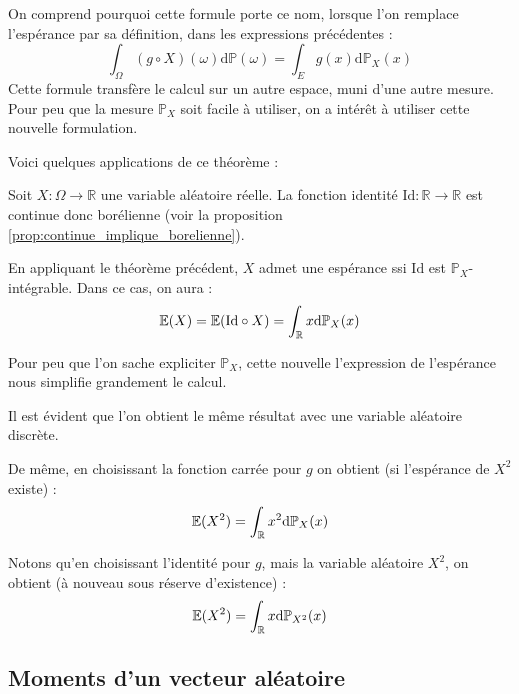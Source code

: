 \documentclass[../integ-proba.tex]{subfiles}
\begin{document}
\begin{rem}
    On comprend pourquoi cette formule porte ce nom, lorsque l'on remplace l'espérance par sa définition, dans les expressions précédentes :
    $$
    \int_\Omega (g \circ X)(\omega) \text{d} \mathbb{P}(\omega) = \int_E g(x) \text{d} \mathbb{P}_X(x)
    $$
    Cette formule transfère le calcul sur un autre espace, muni d'une autre mesure.
    Pour peu que la mesure $\mathbb{P}_X$ soit facile à utiliser, on a intérêt à utiliser cette nouvelle formulation.
\end{rem}

Voici quelques applications de ce théorème :

\begin{exemple}
    Soit $X:\Omega \longrightarrow \mathbb{R}$ une variable aléatoire réelle.
    La fonction identité $\text{Id}:\mathbb{R} \longrightarrow \mathbb{R}$ est continue donc borélienne (voir la proposition \ref{prop:continue_implique_borelienne}).

    En appliquant le théorème précédent, $X$ admet une espérance ssi $\text{Id}$ est $\mathbb{P}_X$-intégrable.
    Dans ce cas, on aura :
    $$
    \mathbb{E}(X) = \mathbb{E}(\text{Id} \circ X) = \int_\mathbb{R} x\textnormal{d}\mathbb{P}_X(x)
    $$

    Pour peu que l'on sache expliciter $\mathbb{P}_X$, cette nouvelle l'expression de l'espérance nous simplifie grandement le calcul.

    Il est évident que l'on obtient le même résultat avec une variable aléatoire discrète.
\end{exemple}

\begin{exemple}
    De même, en choisissant la fonction carrée pour $g$ on obtient (si l'espérance de $X^2$ existe) :
    $$
    \mathbb{E}(X^2) = \int_\mathbb{R} x^2\textnormal{d}\mathbb{P}_X(x)
    $$

    Notons qu'en choisissant l'identité pour $g$, mais la variable aléatoire $X^2$, on obtient (à nouveau sous réserve d'existence) :
    $$
    \mathbb{E}(X^2) = \int_\mathbb{R} x\textnormal{d}\mathbb{P}_{X^2}(x)
    $$
\end{exemple}

\subsection{Moments d'un vecteur aléatoire}
\end{document}
